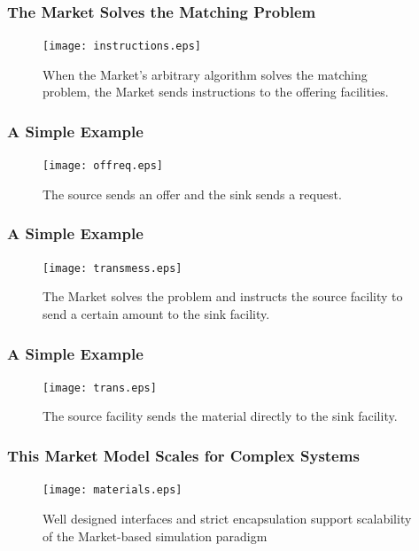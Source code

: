 \begin{frame}[ctb!]
  \frametitle{The Market Solves the Matching Problem}
  \begin{figure}[htbp!]
    \begin{center}
      \texttt{[image: instructions.eps]}
    \end{center}
    \caption{ When the Market's arbitrary algorithm solves the 
    matching problem, the Market sends instructions to the offering 
    facilities.} 
    \label{fig:instructions}
  \end{figure}
\end{frame}
\begin{frame}[ctb!]
  \frametitle{A Simple Example}
  \begin{figure}[htbp!]
    \begin{center}
      \texttt{[image: offreq.eps]}
    \end{center}
    \caption{ The source sends an offer and the sink sends a request.} 
    \label{fig:offreq}
  \end{figure}
\end{frame}
\begin{frame}[ctb!]
  \frametitle{A Simple Example}
  \begin{figure}[htbp!]
    \begin{center}
      \texttt{[image: transmess.eps]}
    \end{center}
    \caption{ The Market solves the problem and instructs the source 
    facility to send a certain amount to the sink facility.} 
    \label{fig:transmess}
  \end{figure}
\end{frame}
\begin{frame}[ctb!]
  \frametitle{A Simple Example}
  \begin{figure}[htbp!]
    \begin{center}
      \texttt{[image: trans.eps]}
    \end{center}
    \caption{ The source facility sends the material directly to the 
    sink facility.} 
    \label{fig:trans}
  \end{figure}
\end{frame}
\begin{frame}[ctb!]
  \frametitle{This Market Model Scales for Complex Systems}
  \begin{figure}[htbp!]
    \begin{center}
      \texttt{[image: materials.eps]}
    \end{center}
    \caption{Well designed interfaces and strict encapsulation support 
    scalability of the Market-based simulation paradigm 
    \cite{oliver_geniusv2:_2009}}
    \label{fig:materials}
  \end{figure}
\end{frame}
